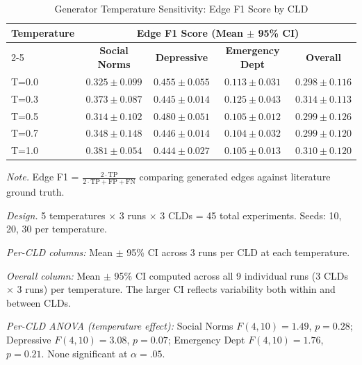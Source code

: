 \begin{table}[H]
\centering
\caption{Generator Temperature Sensitivity: Edge F1 Score by CLD}
\label{tab:temperature_sensitivity}
\begin{threeparttable}
\begin{tabular}{lcccc}
\toprule
\textbf{Temperature} & \multicolumn{4}{c}{\textbf{Edge F1 Score (Mean $\pm$ 95\% CI)}} \\
\cmidrule(lr){2-5}
 & \textbf{Social Norms} & \textbf{Depressive} & \textbf{Emergency Dept} & \textbf{Overall} \\
\midrule
T=0.0 & $0.325 \pm 0.099$ & $0.455 \pm 0.055$ & $0.113 \pm 0.031$ & $0.298 \pm 0.116$ \\
T=0.3 & $0.373 \pm 0.087$ & $0.445 \pm 0.014$ & $0.125 \pm 0.043$ & $0.314 \pm 0.113$ \\
T=0.5 & $0.314 \pm 0.102$ & $0.480 \pm 0.051$ & $0.105 \pm 0.012$ & $0.299 \pm 0.126$ \\
T=0.7 & $0.348 \pm 0.148$ & $0.446 \pm 0.014$ & $0.104 \pm 0.032$ & $0.299 \pm 0.120$ \\
T=1.0 & $0.381 \pm 0.054$ & $0.444 \pm 0.027$ & $0.105 \pm 0.013$ & $0.310 \pm 0.120$ \\
\bottomrule
\end{tabular}
\begin{tablenotes}
\small
\item \textit{Note.} Edge F1 = $\frac{2 \cdot \text{TP}}{2 \cdot \text{TP} + \text{FP} + \text{FN}}$ comparing generated edges against literature ground truth.
\item \textit{Design.} 5 temperatures $\times$ 3 runs $\times$ 3 CLDs = 45 total experiments. Seeds: 10, 20, 30 per temperature.
\item \textit{Per-CLD columns:} Mean $\pm$ 95\% CI across 3 runs per CLD at each temperature.
\item \textit{Overall column:} Mean $\pm$ 95\% CI computed across all 9 individual runs (3 CLDs $\times$ 3 runs) per temperature. The larger CI reflects variability both within and between CLDs.
\item \textit{Per-CLD ANOVA (temperature effect):} Social Norms $F(4,10)=1.49$, $p=0.28$; Depressive $F(4,10)=3.08$, $p=0.07$; Emergency Dept $F(4,10)=1.76$, $p=0.21$. None significant at $\alpha=.05$.
\end{tablenotes}
\end{threeparttable}
\end{table}